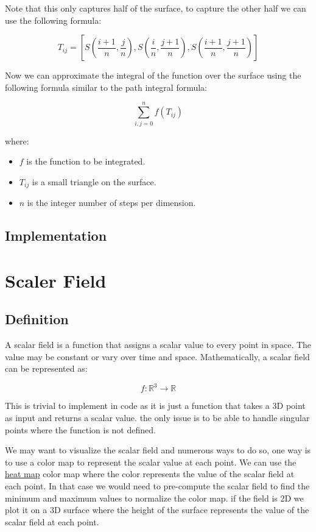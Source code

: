 \documentclass[12pt]{article}
\begin{document}
Note that this only captures half of the surface, to capture the other half we can use the following formula:

\[
    T_{ij} = \left[S\left(\frac{i + 1}{n}, \frac{j}{n}\right), S\left(\frac{i}{n}, \frac{j + 1}{n}\right), S\left(\frac{i + 1}{n}, \frac{j + 1}{n}\right)\right]
\]

Now we can approximate the integral of the function over the surface using the following formula similar to the path integral formula:

\[
    \sum_{i, j=0}^{n} f(T_{ij})
\]

where:

\begin{itemize}
    \item \(f\) is the function to be integrated.
    \item \(T_{ij}\) is a small triangle on the surface.
    \item \(n\) is the integer number of steps per dimension.
\end{itemize}

\subsection{Implementation}

\newpage
\section{Scaler Field}
\subsection{Definition}

A scalar field is a function that assigns a scalar value to every point in space. The value may be constant or vary over time and space. Mathematically, a scalar field can be represented as:

\[
    f: \mathbb{R}^3 \rightarrow \mathbb{R}
\]

This is trivial to implement in code as it is just a function that takes a 3D point as input and returns a scalar value.
the only issue is to be able to handle singular points where the function is not defined.

We may want to visualize the scalar field and numerous ways to do so, one way is to use a color map to represent the scalar value at each point. We can use the \href{https://en.wikipedia.org/wiki/Heat_map}{heat map} color map where the color represents the value of the scalar field at each point.
In that case we would need to pre-compute the scalar field to find the minimum and maximum values to normalize the color map. if the field is 2D we plot it on a 3D surface where the height of the surface represents the value of the scalar field at each point.
\end{document}
